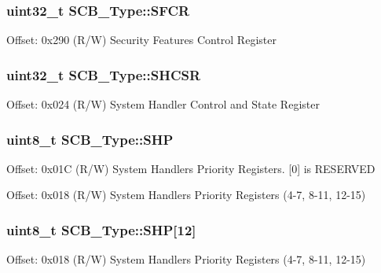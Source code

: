 \subsubsection[{\texorpdfstring{S\+F\+CR}{SFCR}}]{ uint32\+\_\+t S\+C\+B\+\_\+\+Type\+::\+S\+F\+CR}\hypertarget{struct_s_c_b___type_a00ae0f2f224605dc8980a19d7624e533}{}\label{struct_s_c_b___type_a00ae0f2f224605dc8980a19d7624e533}
Offset\+: 0x290 (R/W) Security Features Control Register 
\subsubsection[{\texorpdfstring{S\+H\+C\+SR}{SHCSR}}]{ uint32\+\_\+t S\+C\+B\+\_\+\+Type\+::\+S\+H\+C\+SR}\hypertarget{struct_s_c_b___type_ae9891a59abbe51b0b2067ca507ca212f}{}\label{struct_s_c_b___type_ae9891a59abbe51b0b2067ca507ca212f}
Offset\+: 0x024 (R/W) System Handler Control and State Register 
\subsubsection[{\texorpdfstring{S\+HP}{SHP}}]{ uint8\+\_\+t S\+C\+B\+\_\+\+Type\+::\+S\+HP}\hypertarget{struct_s_c_b___type_a16d5a38234fb96ac6a5c4b2a9e78c1be}{}\label{struct_s_c_b___type_a16d5a38234fb96ac6a5c4b2a9e78c1be}
Offset\+: 0x01C (R/W) System Handlers Priority Registers. \mbox{[}0\mbox{]} is R\+E\+S\+E\+R\+V\+ED

Offset\+: 0x018 (R/W) System Handlers Priority Registers (4-\/7, 8-\/11, 12-\/15) 
\subsubsection[{\texorpdfstring{S\+HP}{SHP}}]{ uint8\+\_\+t S\+C\+B\+\_\+\+Type\+::\+S\+HP\mbox{[}12\mbox{]}}\hypertarget{struct_s_c_b___type_af6336103f8be0cab29de51daed5a65f4}{}\label{struct_s_c_b___type_af6336103f8be0cab29de51daed5a65f4}
Offset\+: 0x018 (R/W) System Handlers Priority Registers (4-\/7, 8-\/11, 12-\/15) 

